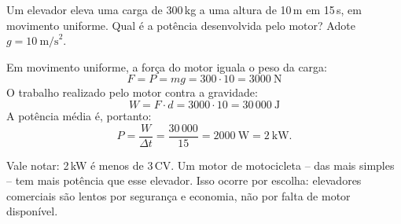 \vspace{0.3cm}

\begin{exemplo}[Nível I]\label{exemplo_energia_potenciaex01}

Um elevador eleva uma carga de 300\,kg a uma altura de 10\,m em 15\,s,
em movimento uniforme. Qual é a potência desenvolvida pelo motor?
Adote $g = 10\ \text{m/s}^2$.

\resolucao

Em movimento uniforme, a força do motor iguala o peso da carga:
\[
F = P = mg = 300 \cdot 10 = 3000\ \text{N}
\]
O trabalho realizado pelo motor contra a gravidade:
\[
W = F \cdot d = 3000 \cdot 10 = 30\,000\ \text{J}
\]
A potência média é, portanto:
\[
P = \frac{W}{\Delta t} = \frac{30\,000}{15} = 2000\ \text{W} = 2\ \text{kW}.
\]

\medskip
\noindent Vale notar: 2\,kW é menos de 3\,CV. Um motor de motocicleta -- das mais simples --
tem mais potência que esse elevador. Isso ocorre por escolha: elevadores comerciais
são lentos por segurança e economia, não por falta de motor disponível.

\end{exemplo}


\vspace{0.3cm}





